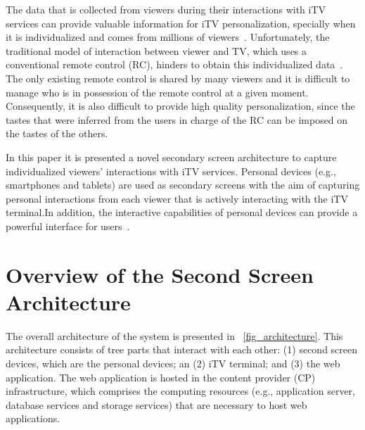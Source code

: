 \documentclass[journal]{IEEEtran}
\begin{document}
The data that is collected from viewers during their interactions with iTV services can provide valuable information for iTV personalization, specially when it is individualized and comes from millions of viewers~\cite{Teixeira2010}. Unfortunately, the traditional model of interaction between viewer and TV, which uses a conventional remote control (RC), hinders to obtain this individualized data~\cite{Cesar2008}. The only existing remote control is shared by many viewers and it is difficult to manage who is in possession of the remote control at a given moment. Consequently, it is also difficult to provide high quality personalization, since the tastes that were inferred from the users in charge of the RC can be imposed on the tastes of the others.

In this paper it is presented a novel secondary screen architecture to capture individualized viewers' interactions with iTV services. Personal devices (e.g., smartphones and tablets) are used as secondary screens with the aim of capturing personal interactions from each viewer that is actively interacting with the iTV terminal.In addition, the interactive capabilities of personal devices can provide a powerful interface for users~\cite{Lee2013}.

\section{Overview of the Second Screen Architecture}

The overall architecture of the system is presented in \figurename~\ref{fig_architecture}. This architecture consists of tree parts that interact with each other: (1) second screen devices, which are the personal devices; an (2) iTV terminal; and (3) the web application. The web application is hosted in the content provider (CP) infrastructure, which comprises the computing resources (e.g., application server, database services and storage services) that are necessary to host web applications.
\end{document}
